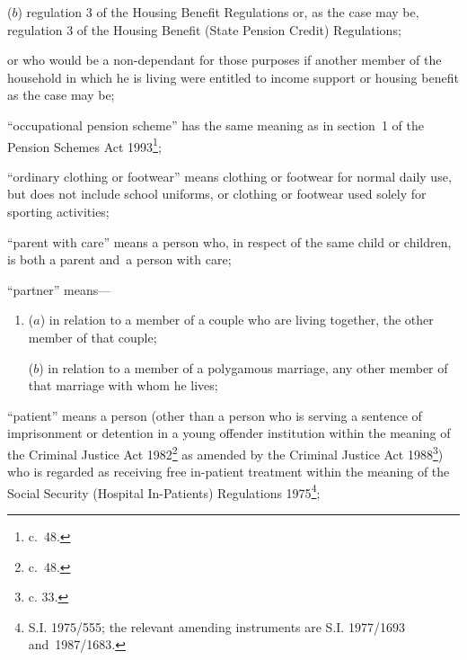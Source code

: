 \documentclass[12pt,a4paper]{article}
\begin{document}
\begin{enumerate}
\begin{enumerate}

($b$) regulation 3 of the Housing Benefit Regulations or, as the case may be, regulation 3 of the Housing Benefit (State Pension Credit) Regulations;
\end{enumerate}
or who would be a non-dependant for those purposes if another member of the household in which he is living were entitled to income support or housing benefit as the case may be;


“occupational pension scheme” has the same meaning as in 
section~1 of the Pension Schemes Act 1993\footnote{ c.~48.};  %

“ordinary clothing or footwear” means clothing or footwear for normal daily use, but does not include school uniforms, or clothing or footwear used solely for sporting activities;

“parent with care” means a person who, in respect of the same child or children, is both a parent and~a person with care;

“partner” means—
\begin{enumerate}\item[]
($a$)
in relation to a member of 
a couple  %
who are living together, the other member of that couple;

($b$)
in relation to a member of a polygamous marriage, any other member of that marriage with whom he lives;
\end{enumerate}

“patient” means a person (other than a person who is serving a sentence of imprisonment or detention in a young offender institution within the meaning of the Criminal Justice Act 1982\footnote{ c.~48.} as amended by the Criminal Justice Act 1988\footnote{ c. 33.}) who is regarded as receiving free in-patient treatment within the meaning of the Social Security (Hospital In-Patients) Regulations 1975\footnote{\frenchspacing S.I. 1975/555; the relevant amending instruments are S.I. 1977/1693 and~1987/1683.};


\end{enumerate}
\end{document}
